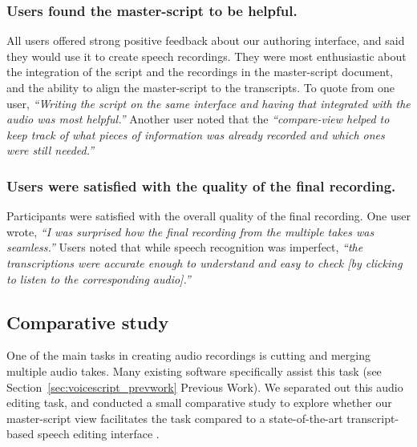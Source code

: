 \subsubsection{Users found the master-script to be helpful.}
All users offered strong positive feedback about our authoring
interface, and said they would use it to create speech recordings. They were most enthusiastic about the integration
of the script and the recordings in the master-script document,
and the ability to align the master-script to the transcripts.
To quote from one user, \textit{``Writing the script on the same interface and having
that integrated with the audio was most helpful.''}  Another user noted
that the \textit{``compare-view helped to keep track of what pieces
of information was already recorded and which ones were still
needed.''} 

\subsubsection{Users were satisfied with the quality of the final recording.} 
Participants were satisfied with the overall quality
of the final recording. One user wrote, \textit{``I was surprised
how the final recording from the multiple takes was seamless.''} Users noted that while speech recognition was imperfect, \textit{``the transcriptions were accurate enough to understand and easy to check [by clicking to listen to the corresponding audio].''}

\subsection{Comparative study}

One of the main tasks in creating audio recordings is cutting and merging multiple audio takes. Many existing software specifically assist this task (see Section~\ref{sec:voicescript_prevwork} Previous Work). We separated out this audio editing task, and conducted a small comparative study to explore whether our master-script view facilitates the task compared to a state-of-the-art transcript-based speech editing interface \cite{rubin2013content}.\\
 
